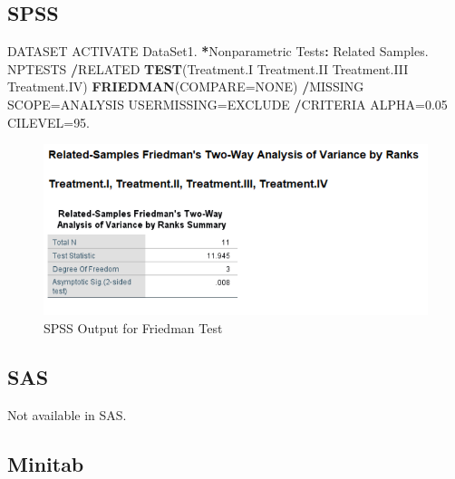 \documentclass[
]{book}
\newenvironment{Shaded}{\begin{snugshade}}{\end{snugshade}}
\newcommand{\DataTypeTok}[1]{\textcolor[rgb]{0.13,0.29,0.53}{#1}}
\newcommand{\FloatTok}[1]{\textcolor[rgb]{0.00,0.00,0.81}{#1}}
\newcommand{\KeywordTok}[1]{\textcolor[rgb]{0.13,0.29,0.53}{\textbf{#1}}}
\newcommand{\NormalTok}[1]{#1}
\newcommand{\OperatorTok}[1]{\textcolor[rgb]{0.81,0.36,0.00}{\textbf{#1}}}
\newcommand{\StringTok}[1]{\textcolor[rgb]{0.31,0.60,0.02}{#1}}
\begin{document}
\hypertarget{spss-4}{%
\subsection{SPSS}\label{spss-4}}

\begin{Shaded}
\begin{Highlighting}[]
\NormalTok{DATASET ACTIVATE DataSet1.}
\OperatorTok{*}\NormalTok{Nonparametric Tests}\OperatorTok{:}\StringTok{ }\NormalTok{Related Samples. }
\NormalTok{NPTESTS }
  \OperatorTok{/}\NormalTok{RELATED }\KeywordTok{TEST}\NormalTok{(Treatment.I Treatment.II Treatment.III Treatment.IV) }\KeywordTok{FRIEDMAN}\NormalTok{(}\DataTypeTok{COMPARE=}\NormalTok{NONE) }
  \OperatorTok{/}\NormalTok{MISSING SCOPE=ANALYSIS USERMISSING=EXCLUDE}
  \OperatorTok{/}\NormalTok{CRITERIA ALPHA=}\FloatTok{0.05}\NormalTok{  CILEVEL=}\FloatTok{95.}
\end{Highlighting}
\end{Shaded}

\begin{figure}[!h]
\includegraphics{Screenshots/Friedman Test/FriedmanSPSS} \caption{\label{fig:FriedmanSPSS}SPSS Output for Friedman Test}\label{fig:FriedmanSPSS}
\end{figure}

\hypertarget{sas-4}{%
\subsection{SAS}\label{sas-4}}

Not available in SAS.

\hypertarget{minitab-4}{%
\subsection{Minitab}\label{minitab-4}}
\end{document}
